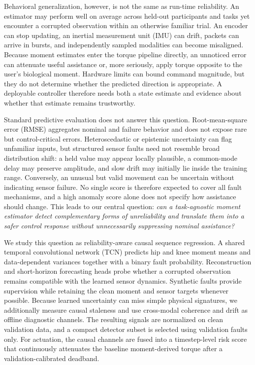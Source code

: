 \documentclass[letterpaper]{article} %
\begin{document}
Behavioral generalization, however, is not the same as run-time reliability.
An estimator may perform well on average across held-out participants and tasks yet encounter a corrupted observation within an otherwise familiar trial.
An encoder can stop updating, an inertial measurement unit (IMU) can drift, packets can arrive in bursts, and independently sampled modalities can become misaligned.
Because moment estimates enter the torque pipeline directly, an unnoticed error can attenuate useful assistance or, more seriously, apply torque opposite to the user's biological moment.
Hardware limits can bound command magnitude, but they do not determine whether the predicted direction is appropriate.
A deployable controller therefore needs both a state estimate and evidence about whether that estimate remains trustworthy.

Standard predictive evaluation does not answer this question.
Root-mean-square error (RMSE) aggregates nominal and failure behavior and does not expose rare but control-critical errors.
Heteroscedastic or epistemic uncertainty can flag unfamiliar inputs, but structured sensor faults need not resemble broad distribution shift: a held value may appear locally plausible, a common-mode delay may preserve amplitude, and slow drift may initially lie inside the training range.
Conversely, an unusual but valid movement can be uncertain without indicating sensor failure.
No single score is therefore expected to cover all fault mechanisms, and a high anomaly score alone does not specify how assistance should change.
This leads to our central question: \emph{can a task-agnostic moment estimator detect complementary forms of unreliability and translate them into a safer control response without unnecessarily suppressing nominal assistance?}

We study this question as reliability-aware causal sequence regression.
A shared temporal convolutional network (TCN) predicts hip and knee moment means and data-dependent variances together with a binary fault probability.
Reconstruction and short-horizon forecasting heads probe whether a corrupted observation remains compatible with the learned sensor dynamics.
Synthetic faults provide supervision while retaining the clean moment and sensor targets whenever possible.
Because learned uncertainty can miss simple physical signatures, we additionally measure causal staleness and use cross-modal coherence and drift as offline diagnostic channels.
The resulting signals are normalized on clean validation data, and a compact detector subset is selected using validation faults only.
For actuation, the causal channels are fused into a timestep-level risk score that continuously attenuates the baseline moment-derived torque after a validation-calibrated deadband.
\end{document}
